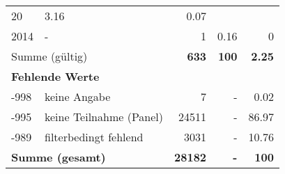 \begin{longtable}{lXrrr}
       \num{20} &
       \num[round-mode=places,round-precision=2]{3,16} &
         \num[round-mode=places,round-precision=2]{0,07} \\

     2014 &
     \multicolumn{1}{X}{ -  } &


       \num{1} &
       \num[round-mode=places,round-precision=2]{0,16} &
         \num[round-mode=places,round-precision=2]{0} \\
     \midrule
     \multicolumn{2}{l}{Summe (gültig)} &
       \textbf{\num{633}} &
     \textbf{100} &
       \textbf{\num[round-mode=places,round-precision=2]{2,25}} \\
     \multicolumn{5}{l}{\textbf{Fehlende Werte}}\\
       -998 &
       keine Angabe &
         \num{7} &
        - &
         \num[round-mode=places,round-precision=2]{0,02} \\
       -995 &
       keine Teilnahme (Panel) &
         \num{24511} &
        - &
         \num[round-mode=places,round-precision=2]{86,97} \\
       -989 &
       filterbedingt fehlend &
         \num{3031} &
        - &
         \num[round-mode=places,round-precision=2]{10,76} \\
     \midrule
     \multicolumn{2}{l}{\textbf{Summe (gesamt)}} &
          \textbf{\num{28182}} &
        \textbf{-} &
        \textbf{100} \\
     \bottomrule
     \end{longtable}
     
